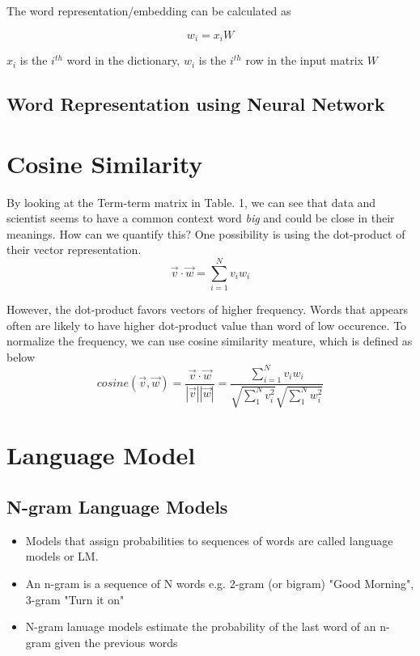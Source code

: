 \documentclass[12pt, oneside]{article}
\begin{document}
The word representation/embedding can be calculated as 

$${w_i=x_iW}$$

${x_i}$ is the ${i^{th}}$ word in the dictionary, ${w_i}$ is the ${i^{th}}$ row in the input matrix ${W}$



\subsection{Word Representation using Neural Network}

\section{Cosine Similarity}

By looking at the Term-term matrix in Table. 1, we can see that data and scientist seems to have a common context word \textit{big} and could be close in their meanings. How can we quantify this? One possibility is using the dot-product of their vector representation.
$$
\vec{v}\cdot\vec{w}=\sum_{i=1}^N v_i w_i
$$

However, the dot-product favors vectors of higher frequency. Words that appears often are likely to have higher dot-product value than word of low occurence. To normalize the frequency, we can use cosine similarity meature, which is defined as below 
$$
cosine(\vec{v}, \vec{w})=\frac{\vec{v}\cdot\vec{w}}{|\vec{v}||\vec{w}|}=\frac{\sum_{i=1}^N v_i w_i}{\sqrt{\sum_1^N v_i^2}\sqrt{\sum_1^N w_i^2}}
$$




\section{Language Model}

\subsection{N-gram Language Models}
\begin{itemize}
\item Models that assign probabilities to sequences of words are called language models or LM.
\item An n-gram is a sequence of N words e.g. 2-gram (or bigram) "Good Morning", 3-gram "Turn it on"
\item N-gram lanuage models estimate the probability of the last word of an n-gram given the previous words
\end{itemize}
\end{document}
